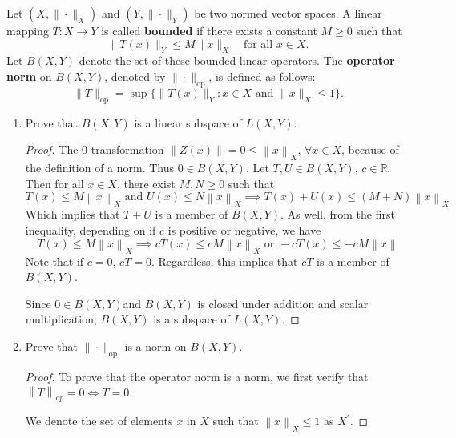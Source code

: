 \documentclass{article}
\theoremstyle{plain} %
\numberwithin{thm}{section} %
\theoremstyle{definition}
\begin{document}
        Let $(X,\|\cdot\|_X)$ and $(Y,\|\cdot\|_Y)$ be two normed vector spaces. A linear mapping $T:X\rightarrow Y$ is called \textbf{bounded} if there exists a constant $M\geq 0$ such that
        \[ \|T(x)\|_Y \leq M \|x\|_X \quad \text{for all $x\in X$.}  \]
        Let $B(X,Y)$ denote the set of these bounded linear operators. The \textbf{operator norm} on $B(X,Y)$, denoted by $\|\cdot\|_{\mathrm{op}}$, is defined as follows:
            \[ \|T\|_{\mathrm{op}} = \sup\{ \|T(x)\|_Y : x\in X \text{ and } \|x\|_X\leq 1 \}. \]
        \begin{enumerate}[label=(\alph*)]
            \item Prove that $B(X,Y)$ is a linear subspace of $L(X,Y)$.
            
            \begin{proof}
                The 0-transformation \(\left\lVert Z(x) \right\rVert  = 0 \leq \left\lVert x \right\rVert _X \text{, } \forall x \in X\), because of the definition of a norm. Thus \(0 \in B(X,Y)\).
                Let \(T, U \in B(X,Y) \text{, } c \in \mathbb{R}\). Then for all \(x \in X\), there exist \(M, N \geq 0\) such that
                \[
                    T(x) \leq M \left\lVert x \right\rVert _X \text{ and } U(x) \leq N \left\lVert x \right\rVert _X \implies T(x) + U(x) \leq (M+N) \left\lVert x \right\rVert _X
                \] 
                Which implies that \(T+U\) is a member of \(B(X,Y)\). As well, from the first inequality, depending on if \(c \) is positive or negative, we have
                \[
                    T(x) \leq M \left\lVert x \right\rVert _X \implies cT(x) \leq  cM \left\lVert x \right\rVert _X \text{ or } -cT(x) \leq  -cM \left\lVert x \right\rVert
                \]
                Note that if \(c=0\), \(cT = 0\). Regardless, this implies that \(cT\) is a member of \(B(X,Y)\).

                Since \(0 \in B(X,Y)\)and \(B(X,Y)\) is closed under addition and scalar multiplication, \(B(X,Y)\) is a subspace of \(L(X,Y)\).

            \end{proof}
            \item Prove that $\|\cdot\|_{\mathrm{op}}$ is a norm on $B(X,Y)$.
        
            \begin{proof}
                To prove that the operator norm is a norm, we first verify that \(\left\lVert T \right\rVert _{op} = 0 \iff T = 0\).

                We denote the set of elements \(x\) in \(X\) such that \(\left\lVert x \right\rVert _X \leq 1\) as \(X^\prime\).


\end{proof}
\end{enumerate}
\end{document}
